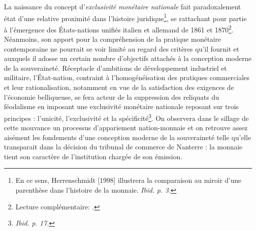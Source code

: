 {La naissance du concept d'\emph{exclusivité monétaire nationale} fait paradoxalement état d'une relative proximité dans l'histoire juridique\footnote{En ce sens, Herrenschmidt [1998] illustrera la comparaison au miroir d'une \og parenthèse dans l'histoire de la monnaie\fg{}. \emph{Ibid. p. 3.}}, se rattachant pour partie à l'émergence des États-nations unifiés italien et allemand de 1861 et 1870\footnote{Lecture complémentaire: .}. Néanmoins, son apport pour la compréhension de la pratique monétaire contemporaine ne pourrait se voir limité au regard des critères qu'il fournit et auxquels il adosse un certain nombre d'objectifs attachés à la conception moderne de la souveraineté. Réceptacle d'ambitions de développement industriel et militaire, l'État-nation, contraint à l'homogénéisation des pratiques commerciales et leur rationalisation, notamment en vue de la satisfaction des exigences de l'économie belliqueuse, se fera acteur de la suppression des reliquats du féodalisme en imposant une exclusivité monétaire nationale reposant sur trois principes : l'unicité, l'exclusivité et la spécificité\footnote{\emph{Ibid. p. 17.}}. On observera dans le sillage de cette mouvance un processus d'appariement nation-monnaie et on retrouve assez aisément les fondements d'une conception moderne de la souveraineté telle qu'elle transparait dans la décision du tribunal de commerce de Nanterre : la monnaie tient son caractère de l'institution chargée de son émission.\par

}
